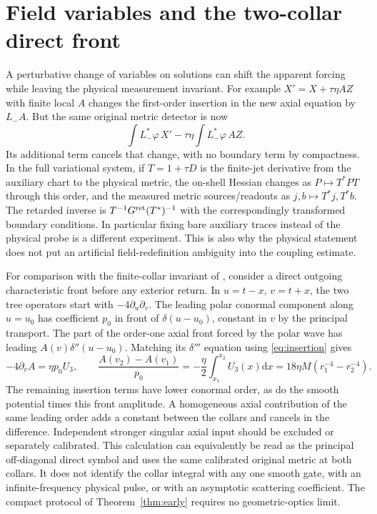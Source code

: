 \documentclass[11pt]{article}
\newcommand{\dd}{\mathrm d}
\begin{document}
\section{Field variables and the two-collar direct front}\label{sec:front}

A perturbative change of variables on solutions can shift the apparent forcing while leaving the physical measurement invariant. For example $X'=X+\tau\eta A Z$ with finite local $A$ changes the first-order insertion in the new axial equation by $L_- A$. But the same original metric detector is now
\[
 \int L_-^*\varphi\,X'-\tau\eta\int L_-^*\varphi\, A Z .
\]
Its additional term cancels that change, with no boundary term by compactness. In the full variational system, if $T=1+\tau D$ is the finite-jet derivative from the auxiliary chart to the physical metric, the on-shell Hessian changes as $P\mapsto T^*PT$ through this order, and the measured metric sources/readouts as $j,b\mapsto T^*j,T^*b$. The retarded inverse is $T^{-1}G^{\rm ret}(T^*)^{-1}$ with the correspondingly transformed boundary conditions. In particular fixing bare auxiliary traces instead of the physical probe is a different experiment. This is also why the physical statement does not put an artificial field-redefinition ambiguity into the coupling estimate.

For comparison with the finite-collar invariant of \cite{P27}, consider a direct outgoing characteristic front before any exterior return. In $u=t-x$, $v=t+x$, the two tree operators start with $-4\partial_u\partial_v$. The leading polar conormal component along $u=u_0$ has coefficient $p_0$ in front of $\delta(u-u_0)$, constant in $v$ by the principal transport. The part of the order-one axial front forced by the polar wave has leading $A(v)\delta''(u-u_0)$. Matching its $\delta'''$ equation using \eqref{eq:insertion} gives
\begin{equation}\label{eq:front}
 -4\partial_v A=\eta p_0 U_3,
 \qquad
 \frac{A(v_2)-A(v_1)}{p_0}=-\frac\eta 2\int_{x_1}^{x_2}U_3(x)\dd x
       =18\eta M(r_1^{-4}-r_2^{-4}) .
\end{equation}
The remaining insertion terms have lower conormal order, as do the smooth potential times this front amplitude. A homogeneous axial contribution of the same leading order adds a constant between the collars and cancels in the difference. Independent stronger singular axial input should be excluded or separately calibrated. This calculation can equivalently be read as the principal off-diagonal direct symbol and uses the same calibrated original metric at both collars. It does not identify the collar integral with any one smooth gate, with an infinite-frequency physical pulse, or with an asymptotic scattering coefficient. The compact protocol of Theorem~\ref{thm:early} requires no geometric-optics limit.
\end{document}
